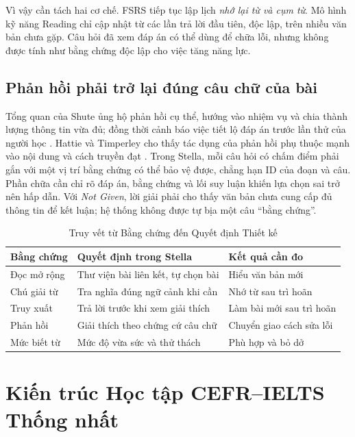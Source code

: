 \documentclass[conference,10pt]{IEEEtran}
\begin{document}
Vì vậy cần tách hai cơ chế. FSRS tiếp tục lập lịch \emph{nhớ lại từ và cụm từ}. Mô hình kỹ năng Reading chỉ cập nhật từ các lần trả lời đầu tiên, độc lập, trên nhiều văn bản chưa gặp. Câu hỏi đã xem đáp án có thể dùng để chữa lỗi, nhưng không được tính như bằng chứng độc lập cho việc tăng năng lực.

\subsection{Phản hồi phải trở lại đúng câu chữ của bài}
Tổng quan của Shute ủng hộ phản hồi cụ thể, hướng vào nhiệm vụ và chia thành lượng thông tin vừa đủ; đồng thời cảnh báo việc tiết lộ đáp án trước lần thử của người học \cite{shute2008}. Hattie và Timperley cho thấy tác dụng của phản hồi phụ thuộc mạnh vào nội dung và cách truyền đạt \cite{hattie2007}. Trong Stella, mỗi câu hỏi có chấm điểm phải gắn với một vị trí bằng chứng có thể bảo vệ được, chẳng hạn ID của đoạn và câu. Phần chữa cần chỉ rõ đáp án, bằng chứng và lối suy luận khiến lựa chọn sai trở nên hấp dẫn. Với \emph{Not Given}, lời giải phải cho thấy văn bản chưa cung cấp đủ thông tin để kết luận; hệ thống không được tự bịa một câu ``bằng chứng''.

\begin{table}[t]
\caption{Truy vết từ Bằng chứng đến Quyết định Thiết kế}
\label{tab:evidence}
\centering\footnotesize
\begin{tabularx}{\columnwidth}{@{}p{}X p{}@{}}
\toprule
Bằng chứng & Quyết định trong Stella & Kết quả cần đo\\
\midrule
Đọc mở rộng \cite{sangers2025} & Thư viện bài liên kết, tự chọn bài & Hiểu văn bản mới\\
Chú giải từ \cite{yanagisawa2020} & Tra nghĩa đúng ngữ cảnh khi cần & Nhớ từ sau trì hoãn\\
Truy xuất \cite{roediger2006} & Trả lời trước khi xem giải thích & Làm bài mới sau trì hoãn\\
Phản hồi \cite{shute2008} & Giải thích theo chứng cứ câu chữ & Chuyển giao cách sửa lỗi\\
Mức biết từ \cite{schmitt2011} & Mức độ vừa sức và thử thách & Phù hợp và bỏ dở\\
\bottomrule
\end{tabularx}
\end{table}

\section{Kiến trúc Học tập CEFR--IELTS Thống nhất}
\end{document}
